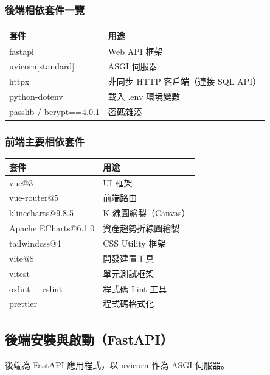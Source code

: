 \documentclass[UTF8, a4paper, 12pt, fontset=none]{ctexart}
\begin{document}
\subsubsection{後端相依套件一覽}
\begin{center}
\begin{tabular}{|p{4.5cm}|p{8cm}|}
    \hline
    套件 & 用途 \\
    \hline
    fastapi & Web API 框架 \\
    \hline
    uvicorn[standard] & ASGI 伺服器 \\
    \hline
    httpx & 非同步 HTTP 客戶端（連接 SQL API） \\
    \hline
    python-dotenv & 載入 .env 環境變數 \\
    \hline
    passlib / bcrypt==4.0.1 & 密碼雜湊 \\
    \hline
\end{tabular}
\end{center}

\subsubsection{前端主要相依套件}
\begin{center}
\begin{tabular}{|p{4.5cm}|p{8cm}|}
    \hline
    套件 & 用途 \\
    \hline
    vue@3 & UI 框架 \\
    \hline
    vue-router@5 & 前端路由 \\
    \hline
    klinecharts@9.8.5 & K 線圖繪製（Canvas） \\
    \hline
    Apache ECharts@6.1.0 & 資產趨勢折線圖繪製 \\
    \hline
    tailwindcss@4 & CSS Utility 框架 \\
    \hline
    vite@8 & 開發建置工具 \\
    \hline
    vitest & 單元測試框架 \\
    \hline
    oxlint + eslint & 程式碼 Lint 工具 \\
    \hline
    prettier & 程式碼格式化 \\
    \hline
\end{tabular}
\end{center}

\subsection {後端安裝與啟動（FastAPI）}
後端為 FastAPI 應用程式，以 uvicorn 作為 ASGI 伺服器。
\end{document}
